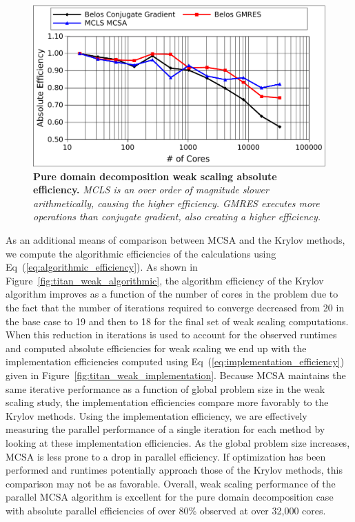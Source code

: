 \begin{figure}[t!]
  \begin{center}
    \includegraphics[width=6in]{chapters/parallel_mc/titan_weak_absolute.pdf}
  \end{center}
  \caption{\textbf{Pure domain decomposition weak scaling absolute
      efficiency.} \textit{MCLS is an over order of magnitude slower
      arithmetically, causing the higher efficiency. GMRES executes
      more operations than conjugate gradient, also creating a higher
      efficiency.}}
  \label{fig:titan_weak_absolute}
\end{figure}

As an additional means of comparison between MCSA and the Krylov
methods, we compute the algorithmic efficiencies of the calculations
using Eq~(\ref{eq:algorithmic_efficiency}). As shown in
Figure~\ref{fig:titan_weak_algorithmic}, the algorithm efficiency of
the Krylov algorithm improves as a function of the number of cores in
the problem due to the fact that the number of iterations required to
converge decreased from 20 in the base case to 19 and then to 18 for
the final set of weak scaling computations. When this reduction in
iterations is used to account for the observed runtimes and computed
absolute efficiencies for weak scaling we end up with the
implementation efficiencies computed using
Eq~(\ref{eq:implementation_efficiency}) given in
Figure~\ref{fig:titan_weak_implementation}. Because MCSA maintains the
same iterative performance as a function of global problem size in the
weak scaling study, the implementation efficiencies compare more
favorably to the Krylov methods. Using the implementation efficiency,
we are effectively measuring the parallel performance of a single
iteration for each method by looking at these implementation
efficiencies. As the global problem size increases, MCSA is less prone
to a drop in parallel efficiency. If optimization has been performed
and runtimes potentially approach those of the Krylov methods, this
comparison may not be as favorable. Overall, weak scaling performance
of the parallel MCSA algorithm is excellent for the pure domain
decomposition case with absolute parallel efficiencies of over 80\%
observed at over 32,000 cores.


